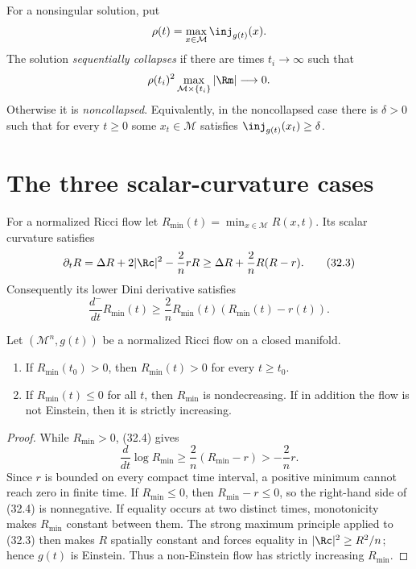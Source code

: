 \begin{definition}
\label{def:chow-iv-sequential-collapse}
For a nonsingular solution, put
\[
 \rho(t)=\max_{x\in\mathcal M}\inj_{g(t)}(x).
\]
The solution \emph{sequentially collapses} if there are times
$t_i\to\infty$ such that
\[
 \rho(t_i)^2\max_{\mathcal M\times\{t_i\}}|\Rm|\longrightarrow0.
\]
Otherwise it is \emph{noncollapsed}.  Equivalently, in the noncollapsed
case there is $\delta>0$ such that for every $t\ge0$ some $x_t\in\mathcal M$
satisfies $\inj_{g(t)}(x_t)\ge\delta$.
\end{definition}

\section{The three scalar-curvature cases}

For a normalized Ricci flow let
$R_{\min}(t)=\min_{x\in\mathcal M}R(x,t)$.  Its scalar curvature satisfies
\begin{equation*}
 \partial_tR=\Delta R+2|\Rc|^2-\frac2n rR
 \ge \Delta R+\frac2nR(R-r).
 \tag{32.3}
\end{equation*}
Consequently its lower Dini derivative satisfies
\begin{equation*}
 \frac{d^-}{dt}R_{\min}(t)
 \ge\frac2nR_{\min}(t)(R_{\min}(t)-r(t)).
 \tag{32.4}
\end{equation*}

\begin{lemma}
\label{lem:chow-iv-minimum-scalar-curvature-monotonicity}
Let $(\mathcal M^n,g(t))$ be a normalized Ricci flow on a closed manifold.
\begin{enumerate}
\item If $R_{\min}(t_0)>0$, then $R_{\min}(t)>0$ for every $t\ge t_0$.
\item If $R_{\min}(t)\le0$ for all $t$, then $R_{\min}$ is nondecreasing.
If in addition the flow is not Einstein, then it is strictly increasing.
\end{enumerate}
\end{lemma}
\begin{proof}
\sketch
While $R_{\min}>0$, (32.4) gives
\[
 \frac d{dt}\log R_{\min}
 \ge \frac2n(R_{\min}-r)>-\frac2n r.
\]
Since $r$ is bounded on every compact time interval, a positive minimum
cannot reach zero in finite time.  If $R_{\min}\le0$, then
$R_{\min}-r\le0$, so the right-hand side of (32.4) is nonnegative.
If equality occurs at two distinct times, monotonicity makes
$R_{\min}$ constant between them.  The strong maximum principle applied to
(32.3) then makes $R$ spatially constant and forces equality in
$|\Rc|^2\ge R^2/n$; hence $g(t)$ is Einstein.  Thus a non-Einstein flow has
strictly increasing $R_{\min}$.
\end{proof}

